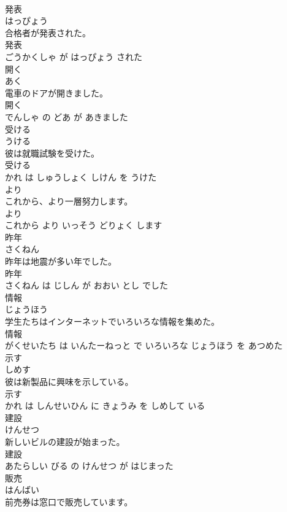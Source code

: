 \documentclass[8pt]{extreport}
\begin{document}
\begin{CJK}{UTF8}{min}
\\	発表	
\\	はっぴょう			
\\	合格者が発表された。	
\\	発表 
\\	ごうかくしゃ が はっぴょう された			
\\	開く	
\\	あく			
\\	電車のドアが開きました。	
\\	開く 
\\	でんしゃ の どあ が あきました			
\\	受ける	
\\	うける			
\\	彼は就職試験を受けた。	
\\	受ける 
\\	かれ は しゅうしょく しけん を うけた			
\\	より	
\\	これから、より一層努力します。	
\\	より 
\\	これから より いっそう どりょく します			
\\	昨年	
\\	さくねん			
\\	昨年は地震が多い年でした。	
\\	昨年 
\\	さくねん は じしん が おおい とし でした			
\\	情報	
\\	じょうほう			
\\	学生たちはインターネットでいろいろな情報を集めた。	
\\	情報 
\\	がくせいたち は いんたーねっと で いろいろな じょうほう を あつめた			
\\	示す	
\\	しめす			
\\	彼は新製品に興味を示している。	
\\	示す 
\\	かれ は しんせいひん に きょうみ を しめして いる			
\\	建設	
\\	けんせつ			
\\	新しいビルの建設が始まった。	
\\	建設 
\\	あたらしい びる の けんせつ が はじまった			
\\	販売	
\\	はんばい			
\\	前売券は窓口で販売しています。	

\end{CJK}
\end{document}
